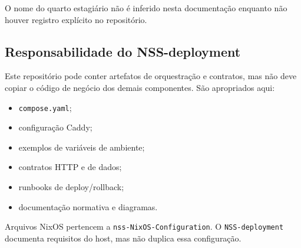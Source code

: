 O nome do quarto estagiário não é inferido nesta documentação enquanto não houver registro explícito no repositório.

\subsection{Responsabilidade do NSS-deployment}

Este repositório pode conter artefatos de orquestração e contratos, mas não deve copiar o código de negócio dos demais componentes. São apropriados aqui:

\begin{itemize}
    \item \texttt{compose.yaml};
    \item configuração Caddy;
    \item exemplos de variáveis de ambiente;
    \item contratos HTTP e de dados;
    \item runbooks de deploy/rollback;
    \item documentação normativa e diagramas.
\end{itemize}

\begin{regra}
Arquivos NixOS pertencem a \texttt{nss-NixOS-Configuration}. O \texttt{NSS-deployment} documenta requisitos do host, mas não duplica essa configuração.
\end{regra}
